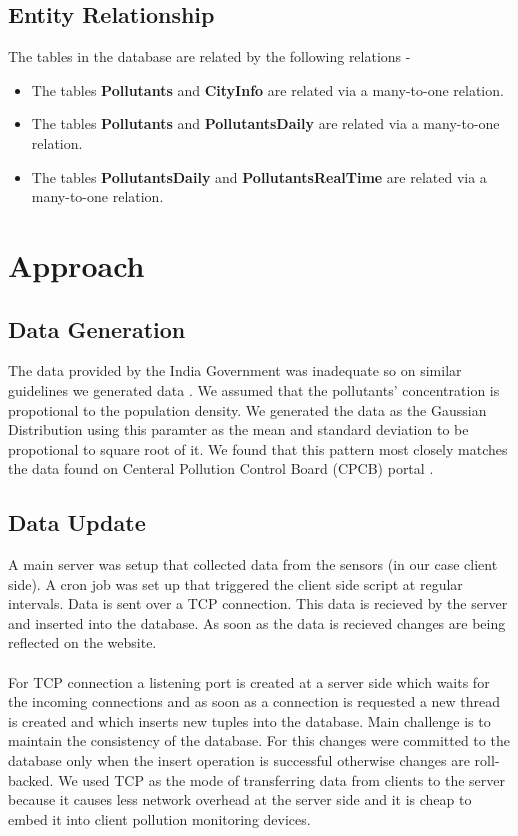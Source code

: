 \documentclass[twocolumn]{article}
\begin{document}
\subsection{Entity Relationship}
The tables in the database are related by the following relations - 
\begin{itemize}
\item The tables \textbf{Pollutants} and \textbf{CityInfo} are related via a many-to-one relation.  
\item The tables \textbf{Pollutants} and \textbf{PollutantsDaily} are related via a many-to-one relation.  
\item The tables \textbf{PollutantsDaily} and \textbf{PollutantsRealTime} are related via a many-to-one relation.  

\end{itemize}



\section{Approach}
\subsection{Data Generation}
The data \cite{gov} provided by the India Government was inadequate so on similar guidelines we generated data \cite{cpcb}. We assumed that the pollutants' concentration is  propotional to the population density. We generated the data as the Gaussian Distribution \cite{gauss} using this paramter as the mean and standard deviation to be propotional to square root of it. We found that this pattern most closely matches the data found on Centeral Pollution Control Board (CPCB) portal \cite{cpcb}.
\subsection{Data Update}
A main server was setup that collected data from the sensors (in our case client side). A cron job was set up that triggered the client side script at regular intervals. Data is sent over a TCP connection. This data is recieved by the server and inserted into the database. As soon as the data is recieved changes are being reflected on the website.\\
\\
For TCP connection a listening port is created at a server side which waits for the incoming connections and as soon as a connection is requested a new thread is created and which inserts new tuples into the database. Main challenge is to maintain the consistency of the database. For this changes were committed to the database only when the insert operation is successful otherwise changes are roll-backed. We used TCP as the mode of transferring data from clients to the server because it causes less network overhead at the server side and it is cheap to embed it into client pollution monitoring devices.
\end{document}
